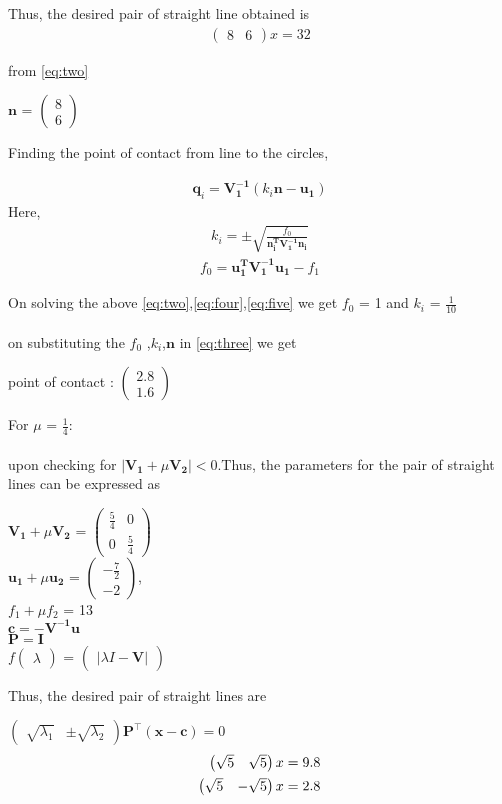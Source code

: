 \documentclass[journal,12pt,twocolumn]{IEEEtran}
\newcommand{\myvec}[1]{\ensuremath{\begin{pmatrix}#1\end{pmatrix}}}
\let\vec\mathbf
\begin{document}
Thus, the desired pair of straight line obtained is 
\begin{align}
\label{eq:two}
\myvec{8 & 6}x = 32
\end{align}

from \eqref{eq:two} \\ 
\begin{center}
$\vec{n}$ = $\myvec{8 \\ 6}$ 
\end{center}	 
Finding the point of contact from line to the circles,

\begin{align}
\label{eq:three}
\boxed{\vec{q}_i = \vec{V_1^{-1}}(k_i\vec{n-u_1})} 
\end{align}
Here, 
\begin{align}
\label{eq:four}
k_i = \pm\sqrt{\frac{f_0}{\vec{n_i^TV_1^{-1}n_i}}}
\end{align}
\begin{align}
\label{eq:five}
f_0 = \vec{u_1^TV_1^{-1}u_1}-f_1
\end{align}

On solving the above \eqref{eq:two},\eqref{eq:four},\eqref{eq:five} we get $f_0$ = 1 and $k_i$ = $\frac{1}{10}$\\ \\
on substituting the $f_0$ ,$k_i$,$\vec{n}$ in \eqref{eq:three} we get \\
\begin{center}
point of contact : $\myvec{2.8 \\ 1.6}$
\end{center}

For $\mu$ = $\frac{1}{4}$: \\ \\
upon checking for $|\vec{V_1}+\mu\vec{V_2}|<0$.Thus, the parameters for the pair of straight lines can be expressed as \\

\begin{center}
$\vec{V_1}+\mu\vec{V_2}$ = $\myvec{\frac{5}{4} & 0 \\ 0 & \frac{5}{4}}$ \\ 
$\vec{u_1}+\mu\vec{u_2}$ = $\myvec{-\frac{7}{2} \\ -2}$, \\
${f_1+\mu f_2}$ = 13 \\ 
$\vec{c} = \vec{-V^{-1}u}$ \\ 
$\vec{P} = \vec{I}$ \\
$f\myvec{\lambda}$ = $\myvec{|\lambda I - \vec{V}|}$
\end{center} 
Thus, the desired pair of straight lines are 
\begin{center}
$\myvec{\sqrt{\lambda_1} & \pm \sqrt{\lambda_2}}\vec{P}^{\top} \vec{(x-c)}=0$ 
\begin{align}
\label{eq:six}
\myvec{\sqrt{5} & \sqrt{5}}x = 9.8 \\
\label{eq:seven}
\vspace{0.5cm}\myvec{\sqrt{5} & -\sqrt{5}}x = 2.8
\end{align}
\end{center}
\end{document}
